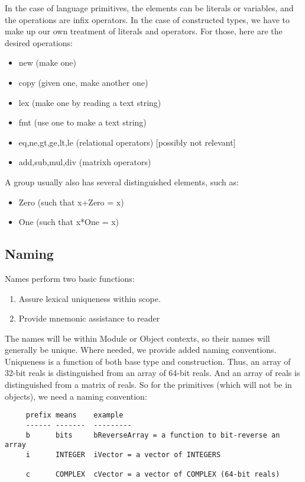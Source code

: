 In the case of language primitives, the elements can be
literals or variables, and the operations are infix
operators.  In the case of constructed types, we have to
make up our own treatment of literals and operators.  For
those, here are the desired operations:
\begin{itemize}
   \item new (make one)
   \item copy (given one, make another one)
   \item lex (make one by reading a text string)
   \item fmt (use one to make a text string)
   \item eq,ne,gt,ge,lt,le (relational operators) [possibly not
     relevant]
   \item add,sub,mul,div (matrixh operators)
\end{itemize}

A group usually also has several distinguished elements,
such as:
\begin{itemize}
  \item Zero (such that x+Zero = x)
  \item One (such that x*One = x)
\end{itemize}

\subsection{Naming}
Names perform two basic functions:
\begin{enumerate}
  \item Assure lexical uniqueness within scope.
  \item Provide mnemonic assistance to reader
\end{enumerate}

The names will be within Module or Object contexts, so their
names will generally be unique.  Where needed, we provide
added naming conventions.  Uniqueness is a function of both
base type and construction.  Thus, an array of 32-bit reals
is distinguished from an array of 64-bit reals.  And an
array of reals is distinguished from a matrix of reals.  So
for the primitives (which will not be in objects), we need a
naming convention:
\begin{tt} \begin{verbatim}
     prefix means    example
     ------ -------  ---------
     b      bits     bReverseArray = a function to bit-reverse an array
     i      INTEGER  iVector = a vector of INTEGERS
     
     c      COMPLEX  cVector = a vector of COMPLEX (64-bit reals)
     
\end{verbatim} \end{tt}

